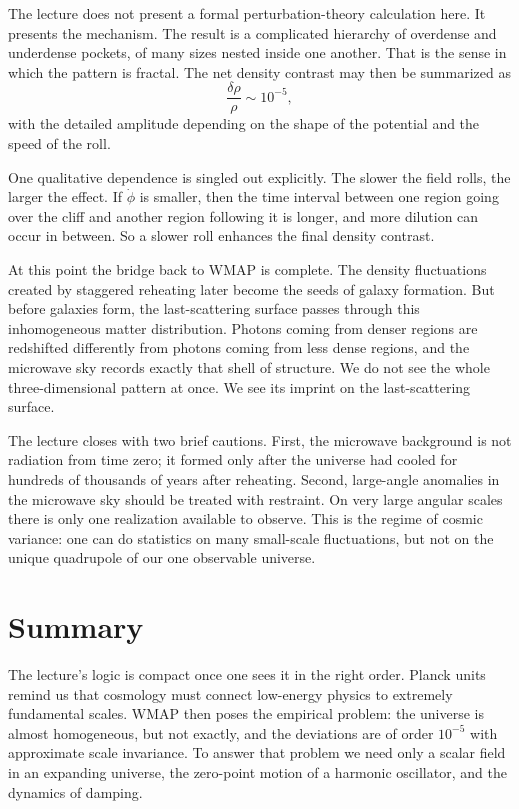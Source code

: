 The lecture does not present a formal perturbation-theory calculation here. It presents the mechanism. The result is a complicated hierarchy of overdense and underdense pockets, of many sizes nested inside one another. That is the sense in which the pattern is fractal. The net density contrast may then be summarized as
\begin{equation}
\frac{\delta\rho}{\rho}\sim 10^{-5},
\end{equation}
with the detailed amplitude depending on the shape of the potential and the speed of the roll.

One qualitative dependence is singled out explicitly. The slower the field rolls, the larger the effect. If \(\dot \phi\) is smaller, then the time interval between one region going over the cliff and another region following it is longer, and more dilution can occur in between. So a slower roll enhances the final density contrast.

At this point the bridge back to WMAP is complete. The density fluctuations created by staggered reheating later become the seeds of galaxy formation. But before galaxies form, the last-scattering surface passes through this inhomogeneous matter distribution. Photons coming from denser regions are redshifted differently from photons coming from less dense regions, and the microwave sky records exactly that shell of structure. We do not see the whole three-dimensional pattern at once. We see its imprint on the last-scattering surface.

The lecture closes with two brief cautions. First, the microwave background is not radiation from time zero; it formed only after the universe had cooled for hundreds of thousands of years after reheating. Second, large-angle anomalies in the microwave sky should be treated with restraint. On very large angular scales there is only one realization available to observe. This is the regime of cosmic variance: one can do statistics on many small-scale fluctuations, but not on the unique quadrupole of our one observable universe.

\section{Summary}

The lecture's logic is compact once one sees it in the right order. Planck units remind us that cosmology must connect low-energy physics to extremely fundamental scales. WMAP then poses the empirical problem: the universe is almost homogeneous, but not exactly, and the deviations are of order \(10^{-5}\) with approximate scale invariance. To answer that problem we need only a scalar field in an expanding universe, the zero-point motion of a harmonic oscillator, and the dynamics of damping.

